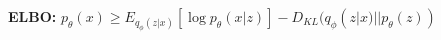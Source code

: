 \textbf{ELBO:} $p_\theta(x) \geq E_{q_\phi(z|x)}[\log p_\theta(x|z)] - D_{KL}(q_\phi(z|x) || p_\theta(z))$\\

